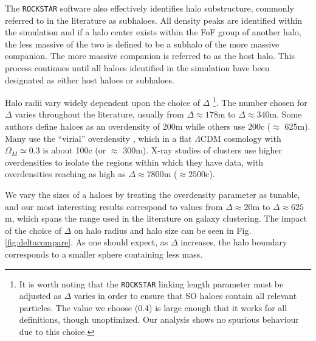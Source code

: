 \documentclass[usenatbib,fleqn]{mnras}
\begin{document}
The {\tt ROCKSTAR} software also effectively identifies halo substructure, commonly referred to in the literature as subhaloes. All density peaks are identified within the simulation and if a halo center exists within the FoF group of another halo, the less massive of the two is defined to be a subhalo of the more massive companion. The more massive companion is referred to as the host halo. This process continues until all haloes identified in the simulation have been designated as either host haloes or subhaloes.

Halo radii vary widely dependent upon the choice of $\Delta$%
\footnote{It is worth noting that the {\tt ROCKSTAR} linking length parameter must be adjusted as $\Delta$ varies in order to ensure that SO haloes contain all relevant particles. The value we choose ($0.4$) is large enough that it works for all definitions, though unoptimized. Our analysis shows no spurious behaviour due to this choice.}.
The number chosen for $\Delta$ varies throughout the literature, usually from $\Delta \approx 178$m to $\Delta \approx 340$m. 
Some authors define haloes as an overdensity of 200m while others use 200c ($\approx$ 625m). 
Many use the ``virial'' overdensity \citep{Bryan1998}, which in a flat $\Lambda$CDM cosmology with $\Omega_M \simeq 0.3$ is about 100c (or $\approx$ 300m).
X-ray studies of clusters use higher overdensities to isolate the regions within which they have data, with overdensities reaching as high as $\Delta \approx 7800$m ($\approx 2500$c).

We vary the sizes of a haloes by treating the overdensity parameter as tunable, and our most interesting results correspond to values from $\Delta \approx 20$m to $\Delta \approx 625$m, which spans the range used in the literature on galaxy clustering. The impact of the choice of $\Delta$ on halo radius and halo size can be seen in Fig.~ \ref{fig:deltacompare}. As one should expect, as $\Delta$ increases, the halo boundary corresponds to a smaller sphere containing less mass. 
\end{document}
